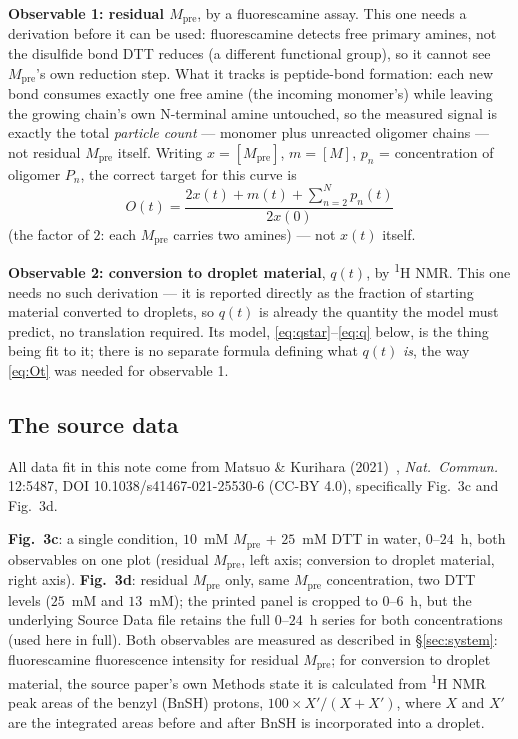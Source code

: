 \documentclass[11pt]{article}
\begin{document}
\textbf{Observable 1: residual $M_{\mathrm{pre}}$}, by a fluorescamine assay. This one needs
a derivation before it can be used: fluorescamine detects free primary amines, not the
disulfide bond DTT reduces (a different functional group), so it cannot see
$M_{\mathrm{pre}}$'s own reduction step. What it tracks is peptide-bond formation: each new
bond consumes exactly one free amine (the incoming monomer's) while leaving the growing
chain's own N-terminal amine untouched, so the measured signal is exactly the total
\emph{particle count} --- monomer plus unreacted oligomer chains --- not residual
$M_{\mathrm{pre}}$ itself. Writing $x=[M_{\mathrm{pre}}]$, $m=[M]$, $p_n$ = concentration of
oligomer $P_n$, the correct target for this curve is
\begin{equation}
O(t) = \frac{2x(t) + m(t) + \sum_{n=2}^{N} p_n(t)}{2x(0)}
\label{eq:Ot}
\end{equation}
(the factor of $2$: each $M_{\mathrm{pre}}$ carries two amines) --- not $x(t)$ itself.

\textbf{Observable 2: conversion to droplet material}, $q(t)$, by \textsuperscript{1}H NMR.
This one needs no such derivation --- it is reported directly as the fraction of starting
material converted to droplets, so $q(t)$ is already the quantity the model must predict, no
translation required. Its model, \eqref{eq:qstar}--\eqref{eq:q} below, is the thing being fit
to it; there is no separate formula defining what $q(t)$ \emph{is}, the way \eqref{eq:Ot} was
needed for observable 1.

\subsection{The source data}
\label{sec:data}

All data fit in this note come from Matsuo \& Kurihara (2021)~\cite{MK2021}, \emph{Nat.\
Commun.} 12:5487, DOI 10.1038/s41467-021-25530-6 (CC-BY 4.0), specifically Fig.~3c and
Fig.~3d.

\textbf{Fig.~3c}: a single condition, $10$~mM $M_{\mathrm{pre}}$ + $25$~mM DTT in water,
$0$--$24$~h, both observables on one plot (residual $M_{\mathrm{pre}}$, left axis; conversion
to droplet material, right axis). \textbf{Fig.~3d}: residual $M_{\mathrm{pre}}$ only, same
$M_{\mathrm{pre}}$ concentration, two DTT levels ($25$~mM and $13$~mM); the printed panel is
cropped to $0$--$6$~h, but the underlying Source Data file retains the full $0$--$24$~h series
for both concentrations (used here in full). Both
observables are measured as described in \S\ref{sec:system}: fluorescamine fluorescence
intensity for residual $M_{\mathrm{pre}}$; for conversion to droplet material, the source
paper's own Methods state it is calculated from \textsuperscript{1}H NMR peak areas of the
benzyl (BnSH) protons, $100\times X'/(X+X')$, where $X$ and $X'$ are the integrated areas
before and after BnSH is incorporated into a droplet.
\end{document}
